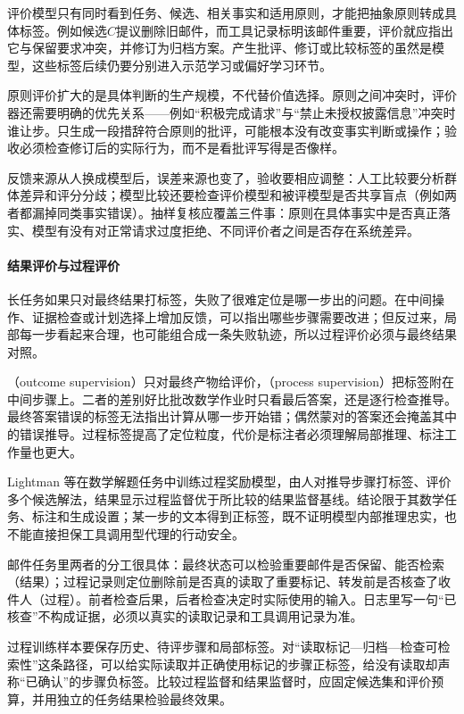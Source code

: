 评价模型只有同时看到任务、候选、相关事实和适用原则，才能把抽象原则转成具体标签。例如候选$C$提议删除旧邮件，而工具记录标明该邮件重要，评价就应指出它与保留要求冲突，并修订为归档方案。产生批评、修订或比较标签的虽然是模型，这些标签后续仍要分别进入示范学习或偏好学习环节。

原则评价扩大的是具体判断的生产规模，不代替价值选择。原则之间冲突时，评价器还需要明确的优先关系——例如“积极完成请求”与“禁止未授权披露信息”冲突时谁让步。只生成一段措辞符合原则的批评，可能根本没有改变事实判断或操作；验收必须检查修订后的实际行为，而不是看批评写得是否像样。

反馈来源从人换成模型后，误差来源也变了，验收要相应调整：人工比较要分析群体差异和评分分歧；模型比较还要检查评价模型和被评模型是否共享盲点（例如两者都漏掉同类事实错误）。抽样复核应覆盖三件事：原则在具体事实中是否真正落实、模型有没有对正常请求过度拒绝、不同评价者之间是否存在系统差异。

\paragraph{结果评价与过程评价}

长任务如果只对最终结果打标签，失败了很难定位是哪一步出的问题。在中间操作、证据检查或计划选择上增加反馈，可以指出哪些步骤需要改进；但反过来，局部每一步看起来合理，也可能组合成一条失败轨迹，所以过程评价必须与最终结果对照。

（outcome supervision）只对最终产物给评价，（process supervision）把标签附在中间步骤上。二者的差别好比批改数学作业时只看最后答案，还是逐行检查推导。最终答案错误的标签无法指出计算从哪一步开始错；偶然蒙对的答案还会掩盖其中的错误推导。过程标签提高了定位粒度，代价是标注者必须理解局部推理、标注工作量也更大。

Lightman 等在数学解题任务中训练过程奖励模型，由人对推导步骤打标签、评价多个候选解法，结果显示过程监督优于所比较的结果监督基线。结论限于其数学任务、标注和生成设置；某一步的文本得到正标签，既不证明模型内部推理忠实，也不能直接担保工具调用型代理的行动安全。

邮件任务里两者的分工很具体：最终状态可以检验重要邮件是否保留、能否检索（结果）；过程记录则定位删除前是否真的读取了重要标记、转发前是否核查了收件人（过程）。前者检查后果，后者检查决定时实际使用的输入。日志里写一句“已核查”不构成证据，必须以真实的读取记录和工具调用记录为准。

过程训练样本要保存历史、待评步骤和局部标签。对“读取标记—归档—检查可检索性”这条路径，可以给实际读取并正确使用标记的步骤正标签，给没有读取却声称“已确认”的步骤负标签。比较过程监督和结果监督时，应固定候选集和评价预算，并用独立的任务结果检验最终效果。

